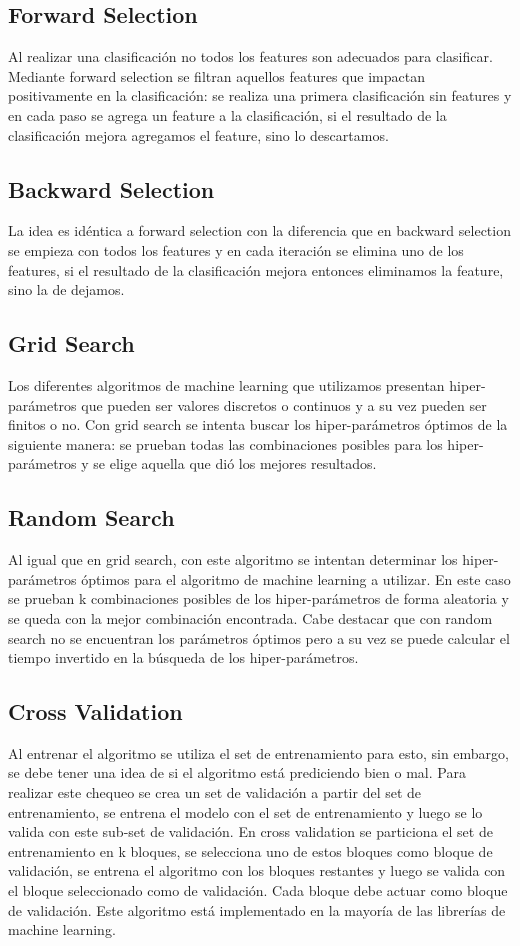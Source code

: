 \documentclass[12pt]{article}
\begin{document}
\subsection{Forward Selection}
Al realizar una clasificación no todos los features son adecuados para clasificar. Mediante forward selection se filtran aquellos features que impactan positivamente en la clasificación: se realiza una primera clasificación sin features y en cada paso se agrega un feature a la clasificación, si el resultado de la clasificación mejora agregamos el feature, sino lo descartamos.


\subsection{Backward Selection}
La idea es idéntica a forward selection con la diferencia que en backward selection se empieza con todos los features y en cada iteración se elimina uno de los features, si el resultado de la clasificación mejora entonces eliminamos la feature, sino la de dejamos.

\subsection{Grid Search}
Los diferentes algoritmos de machine learning que utilizamos presentan hiper-parámetros que pueden ser valores discretos o continuos y a su vez pueden ser finitos o no.
Con grid search se intenta buscar los hiper-parámetros óptimos de la siguiente manera: se prueban todas las combinaciones posibles para los hiper-parámetros y se elige aquella que dió los mejores resultados.

\subsection{Random Search}
Al igual que en grid search, con este algoritmo se intentan determinar los hiper-parámetros óptimos para el algoritmo de machine learning a utilizar. En este caso se prueban k combinaciones posibles de los hiper-parámetros de forma aleatoria y se queda con la mejor combinación encontrada.
Cabe destacar que con random search no se encuentran los parámetros óptimos pero a su vez se puede calcular el tiempo invertido en la búsqueda de los hiper-parámetros.

\subsection{Cross Validation}
Al entrenar el algoritmo se utiliza el set de entrenamiento para esto, sin embargo, se debe tener una idea de si el algoritmo está prediciendo bien o mal. Para realizar este chequeo se crea un set de validación a partir del set de entrenamiento, se entrena el modelo con el set de entrenamiento y luego se lo valida con este sub-set de validación.
En cross validation se particiona el set de entrenamiento en k bloques, se selecciona uno de estos bloques como bloque de validación, se entrena el algoritmo con los bloques restantes y luego se valida con el bloque seleccionado como de validación. Cada bloque debe actuar como bloque de validación.
Este algoritmo está implementado en la mayoría de las librerías de machine learning.
\end{document}

